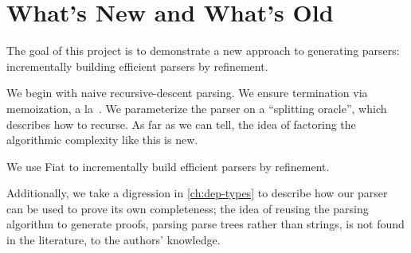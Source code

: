 \section{What's New and What's Old} \label{sec:new} \label{sec:goals}
  The goal of this project is to demonstrate a new approach to generating parsers: incrementally building efficient parsers by refinement.
  
  We begin with naive recursive-descent parsing.    We ensure termination via memoization, a la~\cite{Ridge}.  We parameterize the parser on a ``splitting oracle'', which describes how to recurse.   As far as we can tell, the idea of factoring the algorithmic complexity like this is new.
  
  We use Fiat to incrementally build efficient parsers by refinement. 
  
  Additionally, we take a digression in \autoref{ch:dep-types} to describe how our parser can be used to prove its own completeness; the idea of reusing the parsing algorithm to generate proofs, parsing parse trees rather than strings, is not found in the literature, to the authors' knowledge.
